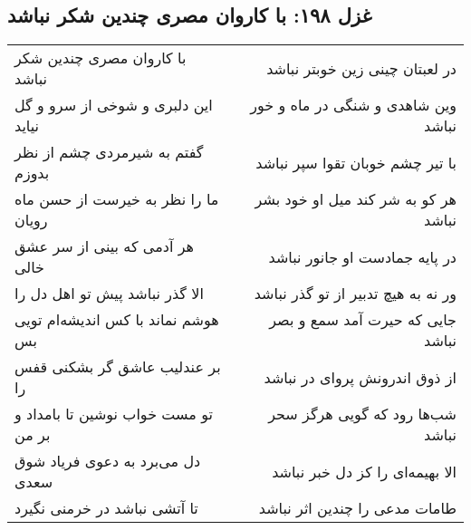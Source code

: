 \begin{center}
\section*{غزل ۱۹۸: با کاروان مصری چندین شکر نباشد}
\label{sec:198}
\begin{longtable}{l p{0.5cm} r}
با کاروان مصری چندین شکر نباشد
&&
در لعبتان چینی زین خوبتر نباشد
\\
این دلبری و شوخی از سرو و گل نیاید
&&
وین شاهدی و شنگی در ماه و خور نباشد
\\
گفتم به شیرمردی چشم از نظر بدوزم
&&
با تیر چشم خوبان تقوا سپر نباشد
\\
ما را نظر به خیرست از حسن ماه رویان
&&
هر کو به شر کند میل او خود بشر نباشد
\\
هر آدمی که بینی از سر عشق خالی
&&
در پایه جمادست او جانور نباشد
\\
الا گذر نباشد پیش تو اهل دل را
&&
ور نه به هیچ تدبیر از تو گذر نباشد
\\
هوشم نماند با کس اندیشه‌ام تویی بس
&&
جایی که حیرت آمد سمع و بصر نباشد
\\
بر عندلیب عاشق گر بشکنی قفس را
&&
از ذوق اندرونش پروای در نباشد
\\
تو مست خواب نوشین تا بامداد و بر من
&&
شب‌ها رود که گویی هرگز سحر نباشد
\\
دل می‌برد به دعوی فریاد شوق سعدی
&&
الا بهیمه‌ای را کز دل خبر نباشد
\\
تا آتشی نباشد در خرمنی نگیرد
&&
طامات مدعی را چندین اثر نباشد
\\
\end{longtable}
\end{center}
